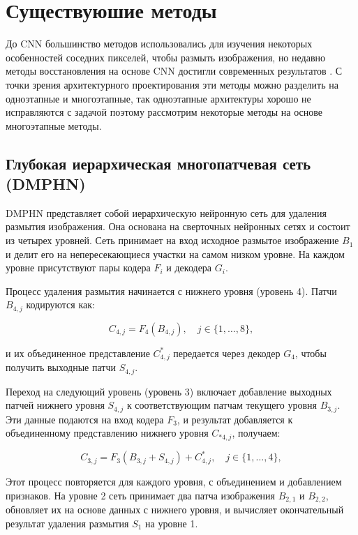 \section{Существуюшие методы}

До CNN большинство методов использовались для изучения некоторых особенностей соседних пикселей, чтобы размыть изображения, но недавно методы восстановления на основе CNN достигли современных результатов \cite{suin2020spatially}. С точки зрения архитектурного проектирования эти методы можно разделить на одноэтапные и многоэтапные, так одноэтапные архитектуры хорошо не исправляются с задачой \cite{zamir2021multi} поэтому рассмотрим некоторые методы на основе многоэтапные методы.

\subsection{Глубокая иерархическая многопатчевая сеть (DMPHN)}

DMPHN представляет собой иерархическую нейронную сеть для удаления размытия изображения. Она основана на сверточных нейронных сетях и состоит из четырех уровней. Сеть принимает на вход исходное размытое изображение \(B_1\) и делит его на непересекающиеся участки на самом низком уровне. На каждом уровне присутствуют пары кодера \(F_i\) и декодера \(G_i\).

Процесс удаления размытия начинается с нижнего уровня (уровень 4). Патчи \(B_{4,j}\) кодируются как:

\begin{equation}
	C_{4,j} = F_{4}(B_{4,j}), \quad j \in \{1, \dots, 8\},
\end{equation}

и их объединенное представление \(C_{4,j}^{\ast}\) передается через декодер \(G_{4}\), чтобы получить выходные патчи \(S_{4,j}\).

Переход на следующий уровень (уровень 3) включает добавление выходных патчей нижнего уровня \(S_{4,j}\) к соответствующим патчам текущего уровня \(B_{3,j}\). Эти данные подаются на вход кодера \(F_{3}\), и результат добавляется к объединенному представлению нижнего уровня \(C_{\ast 4,j}\), получаем:

\begin{equation}
	C_{3,j} = F_{3}(B_{3,j} + S_{4,j}) + C_{4,j}^{\ast}, \quad j \in \{1, \dots, 4\},
\end{equation}

Этот процесс повторяется для каждого уровня, с объединением и добавлением признаков. На уровне 2 сеть принимает два патча изображения \(B_{2,1}\) и \(B_{2,2}\), обновляет их на основе данных с нижнего уровня, и вычисляет окончательный результат удаления размытия \(S_{1}\) на уровне 1.

